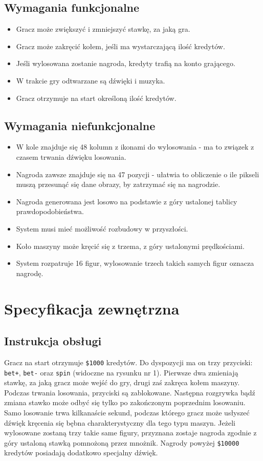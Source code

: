 \documentclass[a4paper,11pt,titlepage]{article}
\begin{document}
\subsection{Wymagania funkcjonalne}
\begin{itemize}
	\item Gracz może zwiększyć i zmniejszyć stawkę, za jaką gra.
	\item Gracz może zakręcić kołem, jeśli ma wystarczającą ilość kredytów.
	\item Jeśli wylosowana zostanie nagroda, kredyty trafią na konto grającego.
	\item W trakcie gry odtwarzane są dźwięki i muzyka.
	\item Gracz otrzymuje na start określoną ilość kredytów.
\end{itemize}

\subsection{Wymagania niefunkcjonalne}
\begin{itemize}
	\item W kole znajduje się 48 kolumn z ikonami do wylosowania - ma to związek z czasem trwania dźwięku losowania.
	\item Nagroda zawsze znajduje się na 47 pozycji - ułatwia to obliczenie o ile pikseli muszą przesunąć się dane obrazy, by zatrzymać się na nagrodzie.
	\item Nagroda generowana jest losowo na podstawie z góry ustalonej tablicy prawdopodobieństwa.
	\item System musi mieć możliwość rozbudowy w przyszłości.
	\item Koło maszyny może kręcić się z trzema, z góry ustalonymi prędkościami.
	\item System rozpatruje 16 figur, wylosowanie trzech takich samych figur oznacza nagrodę.
\end{itemize}

\section{Specyfikacja zewnętrzna}
\subsection{Instrukcja obsługi}
Gracz na start otrzymuje \verb|$1000| kredytów. Do dyspozycji ma on trzy przyciski: \verb|bet+|, \verb|bet-| oraz \verb|spin| (widoczne na rysunku nr 1). Pierwsze dwa zmieniają stawkę, za jaką gracz może wejść do gry, drugi zaś zakręca kołem maszyny. Podczas trwania losowania, przyciski są zablokowane. Następna rozgrywka bądź zmiana stawko może odbyć się tylko po zakończonym poprzednim losowaniu. Samo losowanie trwa kilkanaście sekund, podczas którego gracz może usłyszeć dźwięk kręcenia się bębna charakterystyczny dla tego typu maszyn. Jeżeli wylosowane zostaną trzy takie same figury, przyznana zostaje nagroda zgodnie z góry ustaloną stawką pomnożoną przez mnożnik. Nagrody powyżej \verb|$10000| kredytów posiadają dodatkowo specjalny dźwięk.
\end{document}
